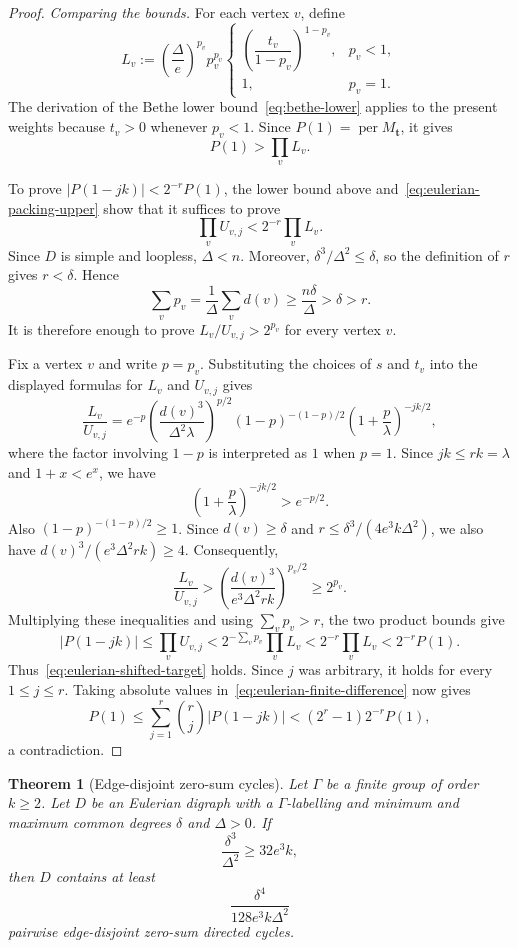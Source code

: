 \documentclass[11pt]{amsart}
\newtheorem{theorem}{Theorem}[section]
\theoremstyle{remark}
\newcommand{\per}{\operatorname{per}}
\begin{document}
\begin{proof}
\medskip\noindent
\emph{Comparing the bounds.}
For each vertex $v$, define
\[
  L_v:=
  \left(\frac{\Delta}{e}\right)^{p_v}p_v^{p_v}
  \begin{cases}
    \left(\dfrac{t_v}{1-p_v}\right)^{1-p_v},&p_v<1,\\[1.2ex]
    1,&p_v=1.
  \end{cases}
\]
The derivation of the Bethe lower bound~\eqref{eq:bethe-lower} applies
to the present weights because $t_v>0$ whenever $p_v<1$.  Since
$P(1)=\per M_{\mathbf t}$, it gives
\[
  P(1)>\prod_vL_v.
\]

To prove $|P(1-jk)|<2^{-r}P(1)$, the lower bound above
and~\eqref{eq:eulerian-packing-upper} show that it suffices to prove
\[
  \prod_vU_{v,j}<2^{-r}\prod_vL_v.
\]
Since $D$ is simple and loopless, $\Delta<n$.  Moreover,
$\delta^3/\Delta^2\le\delta$, so the definition of $r$ gives
$r<\delta$.  Hence
\[
  \sum_vp_v
  =\frac{1}{\Delta}\sum_vd(v)
  \ge\frac{n\delta}{\Delta}
  >\delta
  >r.
\]
It is therefore enough to prove
$L_v/U_{v,j}>2^{p_v}$ for every vertex $v$.

Fix a vertex $v$ and write $p=p_v$.  Substituting the choices of $s$
and $t_v$ into the displayed formulas for $L_v$ and $U_{v,j}$ gives
\[
  \frac{L_v}{U_{v,j}}
  =e^{-p}
  \left(\frac{d(v)^3}{\Delta^2\lambda}\right)^{p/2}
  (1-p)^{-(1-p)/2}
  \left(1+\frac p\lambda\right)^{-jk/2},
\]
where the factor involving $1-p$ is interpreted as $1$ when $p=1$.
Since $jk\le rk=\lambda$ and $1+x<e^x$, we have
\[
  \left(1+\frac p\lambda\right)^{-jk/2}>e^{-p/2}.
\]
Also $(1-p)^{-(1-p)/2}\ge1$.  Since $d(v)\ge\delta$ and
$r\le\delta^3/(4e^3k\Delta^2)$, we also have
$d(v)^3/(e^3\Delta^2rk)\ge4$.  Consequently,
\[
  \frac{L_v}{U_{v,j}}
  >\left(\frac{d(v)^3}{e^3\Delta^2rk}\right)^{p_v/2}
  \ge2^{p_v}.
\]
Multiplying these inequalities and using $\sum_vp_v>r$, the two product
bounds give
\[
  |P(1-jk)|
  \le\prod_vU_{v,j}
  <2^{-\sum_vp_v}\prod_vL_v
  <2^{-r}\prod_vL_v
  <2^{-r}P(1).
\]
Thus~\eqref{eq:eulerian-shifted-target} holds.  Since $j$ was
arbitrary, it holds for every $1\le j\le r$.  Taking absolute values
in~\eqref{eq:eulerian-finite-difference} now gives
\[
  P(1)
  \le\sum_{j=1}^r\binom rj|P(1-jk)|
  <(2^r-1)2^{-r}P(1),
\]
a contradiction.
\end{proof}

\begin{theorem}[Edge-disjoint zero-sum cycles]
\label{thm:eulerian-edge-packing}
Let $\Gamma$ be a finite group of order $k\ge2$.  Let $D$ be an
Eulerian digraph with a $\Gamma$-labelling and minimum and maximum
common degrees $\delta$ and $\Delta>0$.  If
\[
  \frac{\delta^3}{\Delta^2}\ge32e^3k,
\]
then $D$ contains at least
\[
  \frac{\delta^4}{128e^3k\Delta^2}
\]
pairwise edge-disjoint zero-sum directed cycles.
\end{theorem}
\end{document}

